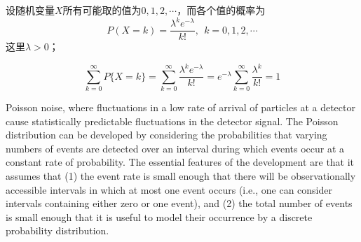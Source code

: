 \documentclass[12pt,a4paper]{article}
\begin{document}
设随机变量$X$所有可能取的值为$0,1,2,\cdots$，而各个值的概率为
\begin{equation}
P(X=k) = \frac{\lambda^k e^{-\lambda}}{k!}, ~~k = 0,1,2,\cdots 
\end{equation}
这里$\lambda > 0$；

\begin{equation}
\sum_{k=0}^{\infty} P\{X=k\} = \sum_{k=0}^{\infty} \frac{\lambda^k e^{-\lambda}}{k!}  =e^{-\lambda} \sum_{k=0}^{\infty} \frac{\lambda^k}{k!} = 1
\end{equation}


\cite{arfken} Poisson noise, where fluctuations in a low rate of arrival of particles at a detector cause statistically predictable fluctuations in the detector signal. The Poisson distribution can be developed by considering the probabilities that varying numbers of events are detected over an interval during which events occur at a constant rate of probability. The essential features of the development are that it assumes that (1) the event rate is small enough that there will be observationally accessible intervals in which at most one event occurs (i.e., one can consider intervals containing either zero or one event), and (2) the total number of events is small enough that it is useful to model their occurrence by a discrete probability distribution.
\end{document}
